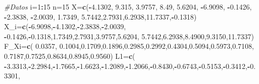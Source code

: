 \documentclass[
  a4paper,
  oneside,
  openany]{book}
\newenvironment{Shaded}{\begin{snugshade}}{\end{snugshade}}
\newcommand{\CommentTok}[1]{\textcolor[rgb]{0.56,0.35,0.01}{\textit{#1}}}
\newcommand{\DecValTok}[1]{\textcolor[rgb]{0.00,0.00,0.81}{#1}}
\newcommand{\FloatTok}[1]{\textcolor[rgb]{0.00,0.00,0.81}{#1}}
\newcommand{\FunctionTok}[1]{\textcolor[rgb]{0.13,0.29,0.53}{\textbf{#1}}}
\newcommand{\NormalTok}[1]{#1}
\newcommand{\OtherTok}[1]{\textcolor[rgb]{0.56,0.35,0.01}{#1}}
\newcommand{\SpecialCharTok}[1]{\textcolor[rgb]{0.81,0.36,0.00}{\textbf{#1}}}
\begin{document}
\begin{Shaded}
\begin{Highlighting}[]
\CommentTok{\#Datos}
\NormalTok{i}\OtherTok{=}\DecValTok{1}\SpecialCharTok{:}\DecValTok{15}
\NormalTok{n}\OtherTok{=}\DecValTok{15}
\NormalTok{X}\OtherTok{=}\FunctionTok{c}\NormalTok{(}\SpecialCharTok{{-}}\FloatTok{4.1302}\NormalTok{, }\FloatTok{9.315}\NormalTok{, }\FloatTok{3.9757}\NormalTok{, }\FloatTok{8.49}\NormalTok{, }\FloatTok{5.6204}\NormalTok{, }\SpecialCharTok{{-}}\FloatTok{6.9098}\NormalTok{, }\SpecialCharTok{{-}}\FloatTok{0.1426}\NormalTok{, }\SpecialCharTok{{-}}\FloatTok{2.3838}\NormalTok{,}
                            \SpecialCharTok{{-}}\FloatTok{2.0039}\NormalTok{, }\FloatTok{1.7349}\NormalTok{, }\FloatTok{5.7442}\NormalTok{,}\FloatTok{2.7931}\NormalTok{,}\FloatTok{6.2938}\NormalTok{,}\FloatTok{11.7337}\NormalTok{,}\SpecialCharTok{{-}}\FloatTok{0.1318}\NormalTok{)}
\NormalTok{X\_i}\OtherTok{=}\FunctionTok{c}\NormalTok{(}\SpecialCharTok{{-}}\FloatTok{6.9098}\NormalTok{,}\SpecialCharTok{{-}}\FloatTok{4.1302}\NormalTok{,}\SpecialCharTok{{-}}\FloatTok{2.3838}\NormalTok{,}\SpecialCharTok{{-}}\FloatTok{2.0039}\NormalTok{, }\SpecialCharTok{{-}}\FloatTok{0.1426}\NormalTok{,}\SpecialCharTok{{-}}\FloatTok{0.1318}\NormalTok{,}\FloatTok{1.7349}\NormalTok{,}\FloatTok{2.7931}\NormalTok{,}\FloatTok{3.9757}\NormalTok{,}\FloatTok{5.6204}\NormalTok{,}
      \FloatTok{5.7442}\NormalTok{,}\FloatTok{6.2938}\NormalTok{,}\FloatTok{8.4900}\NormalTok{,}\FloatTok{9.3150}\NormalTok{,}\FloatTok{11.7337}\NormalTok{)}
\NormalTok{F\_Xi}\OtherTok{=}\FunctionTok{c}\NormalTok{( }\FloatTok{0.0357}\NormalTok{, }\FloatTok{0.1004}\NormalTok{,}\FloatTok{0.1709}\NormalTok{,}\FloatTok{0.1896}\NormalTok{,}\FloatTok{0.2985}\NormalTok{,}\FloatTok{0.2992}\NormalTok{,}\FloatTok{0.4304}\NormalTok{,}\FloatTok{0.5094}\NormalTok{,}\FloatTok{0.5973}\NormalTok{,}\FloatTok{0.7108}\NormalTok{,}
        \FloatTok{0.7187}\NormalTok{,}\FloatTok{0.7525}\NormalTok{,}\FloatTok{0.8634}\NormalTok{,}\FloatTok{0.8945}\NormalTok{,}\FloatTok{0.9560}\NormalTok{)}
\NormalTok{L1}\OtherTok{=}\FunctionTok{c}\NormalTok{( }\SpecialCharTok{{-}}\FloatTok{3.3313}\NormalTok{,}\SpecialCharTok{{-}}\FloatTok{2.2984}\NormalTok{,}\SpecialCharTok{{-}}\FloatTok{1.7665}\NormalTok{,}\SpecialCharTok{{-}}\FloatTok{1.6623}\NormalTok{,}\SpecialCharTok{{-}}\FloatTok{1.2089}\NormalTok{,}\SpecialCharTok{{-}}\FloatTok{1.2066}\NormalTok{,}\SpecialCharTok{{-}}\FloatTok{0.8430}\NormalTok{,}\SpecialCharTok{{-}}\FloatTok{0.6743}\NormalTok{,}\SpecialCharTok{{-}}\FloatTok{0.5153}\NormalTok{,}\SpecialCharTok{{-}}\FloatTok{0.3412}\NormalTok{,}\SpecialCharTok{{-}}\FloatTok{0.3301}\NormalTok{,}

\end{Highlighting}
\end{Shaded}
\end{document}
